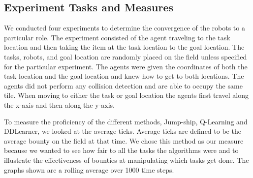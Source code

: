 \documentclass[twocolumn]{article}
\begin{document}

\subsection{Experiment Tasks and Measures}
We conducted four experiments to determine the convergence of the robots to a particular role.  The experiment consisted of the agent traveling to the task location and then taking the item at the task location to the goal location.  The tasks, robots, and goal location are randomly placed on the field unless specified for the particular experiment.  The agents were given the coordinates of both the task location and the goal location and knew how to get to both locations.  The agents did not perform any collision detection and are able to occupy the same tile.  When moving to either the task or goal location the agents first travel along the x-axis and then along the y-axis.

To measure the proficiency of the different methods, Jump-ship, Q-Learning and DDLearner, we looked at the average ticks.  Average ticks are defined to be the average bounty on the field at that time.  We chose this method as our measure because we wanted to see how fair to all the tasks the algorithms were and to illustrate the effectiveness of bounties at manipulating which tasks get done.  The graphs shown are a rolling average over 1000 time steps. 
\end{document}
